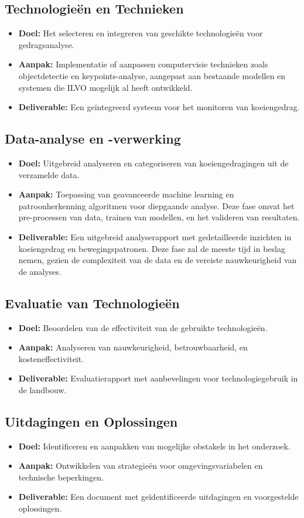 \subsection{Technologieën en Technieken}
\begin{itemize}
  \item \textbf{Doel:} Het selecteren en integreren van geschikte technologieën voor gedragsanalyse.
  \item \textbf{Aanpak:} Implementatie of aanpassen computervisie technieken zoals objectdetectie en keypoints-analyse, aangepast aan bestaande modellen en systemen die ILVO mogelijk al heeft ontwikkeld.
  \item \textbf{Deliverable:} Een geïntegreerd systeem voor het monitoren van koeiengedrag.
\end{itemize}
\subsection{Data-analyse en -verwerking}
\begin{itemize}
  \item \textbf{Doel:} Uitgebreid analyseren en categoriseren van koeiengedragingen uit de verzamelde data.
  \item \textbf{Aanpak:} Toepassing van geavanceerde machine learning en patroonherkenning algoritmen voor diepgaande analyse. Deze fase omvat het pre-processen van data, trainen van modellen, en het valideren van resultaten.
  \item \textbf{Deliverable:} Een uitgebreid analyserapport met gedetailleerde inzichten in koeiengedrag en bewegingspatronen. Deze fase zal de meeste tijd in beslag nemen, gezien de complexiteit van de data en de vereiste nauwkeurigheid van de analyses.
\end{itemize}
\subsection{Evaluatie van Technologieën}
\begin{itemize}
  \item \textbf{Doel:} Beoordelen van de effectiviteit van de gebruikte technologieën.
  \item \textbf{Aanpak:} Analyseren van nauwkeurigheid, betrouwbaarheid, en kosteneffectiviteit.
  \item \textbf{Deliverable:} Evaluatierapport met aanbevelingen voor technologiegebruik in de landbouw.
\end{itemize}
\subsection{Uitdagingen en Oplossingen}
\begin{itemize}
  \item \textbf{Doel:} Identificeren en aanpakken van mogelijke obstakels in het onderzoek.
  \item \textbf{Aanpak:} Ontwikkelen van strategieën voor omgevingsvariabelen en technische beperkingen.
  \item \textbf{Deliverable:} Een document met geïdentificeerde uitdagingen en voorgestelde oplossingen.
\end{itemize}
